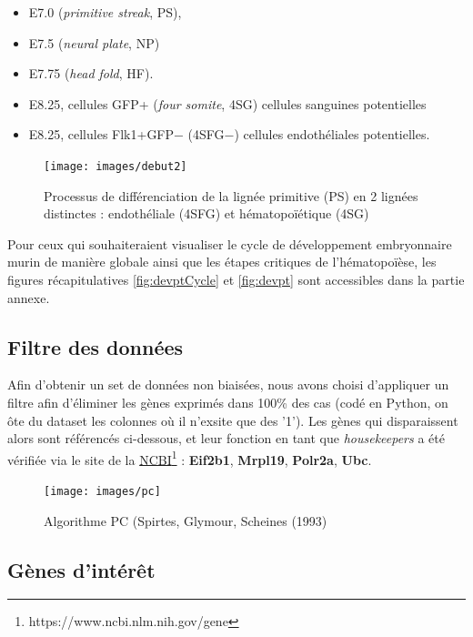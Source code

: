 \documentclass[fleqn,11pt]{SelfArx} %
\begin{document}
\begin{itemize}
\item E7.0 (\textit{primitive streak}, PS),
\item E7.5 (\textit{neural plate}, NP) 
\item E7.75 (\textit{head fold}, HF).
\item E8.25, cellules GFP+ (\textit{four somite}, 4SG) cellules sanguines potentielles
\item E8.25, cellules Flk1+GFP− (4SFG−) cellules endothéliales potentielles.
\end{itemize}



\begin{figure}[ht]
\centering
\texttt{[image: images/debut2]}
\caption{Processus de différenciation de la lignée primitive (PS) en 2 lignées distinctes : endothéliale (4SFG) et hématopoïétique (4SG)}
\label{fig:debut}
\end{figure}

Pour ceux qui souhaiteraient visualiser le cycle de développement embryonnaire murin de manière globale ainsi que les étapes critiques de l'hématopoïèse, les figures récapitulatives \ref{fig:devptCycle} et \ref{fig:devpt} sont accessibles dans la partie annexe. 



\subsection{Filtre des données}
Afin d'obtenir un set de données non biaisées, nous avons choisi d'appliquer un filtre afin d'éliminer les gènes exprimés dans 100\% des cas (codé en Python, on ôte du dataset les colonnes où il n'exsite que des '1'). Les gènes qui disparaissent alors sont référencés ci-dessous, et leur fonction en tant que \textit{housekeepers} a été vérifiée via le site de la \href{https://www.ncbi.nlm.nih.gov/gene}{NCBI}\footnote{https://www.ncbi.nlm.nih.gov/gene} : \textbf{Eif2b1}, \textbf{Mrpl19}, \textbf{Polr2a}, \textbf{Ubc}.


\begin{figure}[ht]
\centering
\texttt{[image: images/pc]}
\caption{Algorithme PC (Spirtes, Glymour, Scheines (1993)}
\label{fig:pc}
\end{figure}

\subsection{Gènes d'intérêt}
\end{document}
